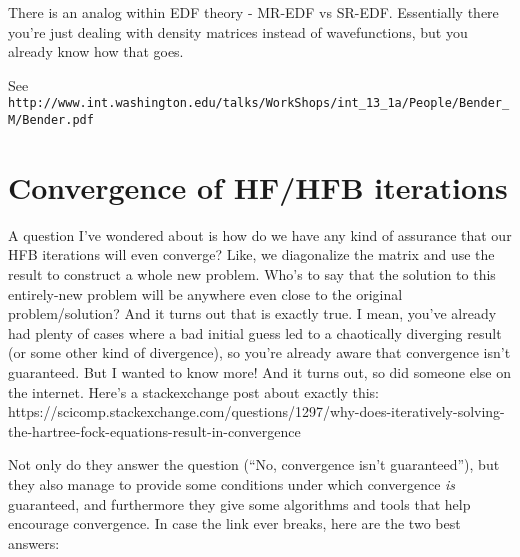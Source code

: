 There is an analog within EDF theory - MR-EDF vs SR-EDF. Essentially there you're just dealing with density matrices instead of wavefunctions, but you already know how that goes.

See \verb|http://www.int.washington.edu/talks/WorkShops/int_13_1a/People/Bender_M/Bender.pdf|

\section*{Convergence of HF/HFB iterations}
A question I've wondered about is how do we have any kind of assurance that our HFB iterations will even converge? Like, we diagonalize the matrix and use the result to construct a whole new problem. Who's to say that the solution to this entirely-new problem will be anywhere even close to the original problem/solution? And it turns out that is exactly true. I mean, you've already had plenty of cases where a bad initial guess led to a chaotically diverging result (or some other kind of divergence), so you're already aware that convergence isn't guaranteed. But I wanted to know more! And it turns out, so did someone else on the internet. Here's a stackexchange post about exactly this: https://scicomp.stackexchange.com/questions/1297/why-does-iteratively-solving-the-hartree-fock-equations-result-in-convergence

Not only do they answer the question (``No, convergence isn't guaranteed''), but they also manage to provide some conditions under which convergence \textit{is} guaranteed, and furthermore they give some algorithms and tools that help encourage convergence. In case the link ever breaks, here are the two best answers:

